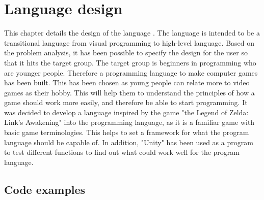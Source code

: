 \chapter{Language design}
This chapter details the design of the language .
The language is intended to be a transitional language from visual programming to high-level language. Based on the problem analysis, it has been possible to specify the design for the user so that it hits the target group.
The target group is beginners in programming who are younger people. Therefore a programming language to make computer games has been built. This has been chosen as young people can relate more to video games as their hobby. 
This will help them to understand the principles of how a game should work more easily, and therefore be able to start programming. 
It was decided to develop a language inspired by the game "the Legend of Zelda: Link’s Awakening" into the programming language, as it is a familiar game with basic game terminologies.
This helps to set a framework for what the program language should be capable of.
In addition, "Unity" has been used as a program to test different functions to find out what could work well for the program language.



\section{Code examples}

